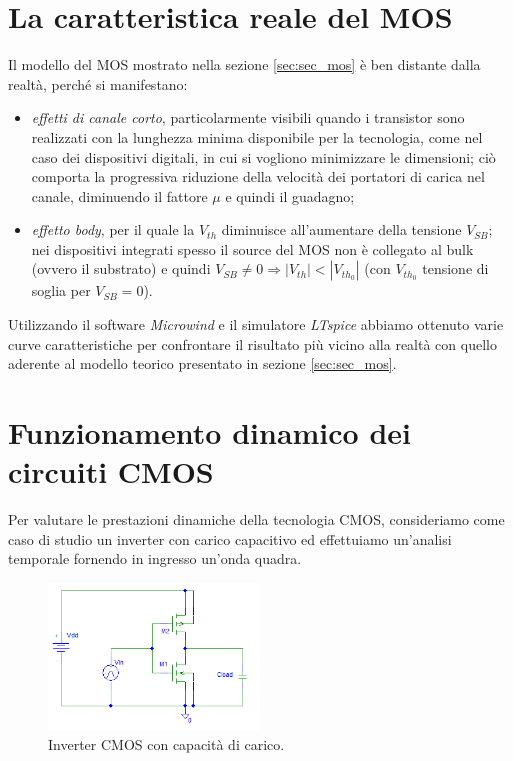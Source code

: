 \section{La caratteristica reale del MOS}
\label{sec:sec_caratteristicaMOS}
Il modello del MOS mostrato nella sezione \ref{sec:sec_mos} è ben distante dalla realtà, perché si manifestano:
\begin{itemize}
	\item \textit{effetti di canale corto}, particolarmente visibili quando i transistor sono realizzati con la lunghezza minima disponibile per la tecnologia, come nel caso dei dispositivi digitali, in cui si vogliono minimizzare le dimensioni; ciò comporta la progressiva riduzione della velocità dei portatori di carica nel canale, diminuendo il fattore $\mu$ e quindi il guadagno;
	\item \textit{effetto body}, per il quale la $V_{th}$ diminuisce all'aumentare della tensione $V_{SB}$; nei dispositivi integrati spesso il source del MOS non è collegato al bulk (ovvero il substrato) e quindi $V_{SB} \neq 0 \Rightarrow \left | V_{th} \right | < \left | V_{th_0} \right | $ (con $V_{th_0}$ tensione di soglia per $V_{SB}=0$).
\end{itemize}

Utilizzando il software \textit{Microwind} e il simulatore \textit{LTspice} abbiamo ottenuto varie curve caratteristiche per confrontare il risultato più vicino alla realtà con quello aderente al modello teorico presentato in sezione \ref{sec:sec_mos}.

\section{Funzionamento dinamico dei circuiti CMOS}

Per valutare le prestazioni dinamiche della tecnologia CMOS, consideriamo come caso di studio un inverter con carico capacitivo ed effettuiamo un'analisi temporale fornendo in ingresso un'onda quadra.

\begin{figure}[hbt!]
	\centering
	\includegraphics[width=0.5\textwidth]{figure/Sch_InverterCMOS.PNG}
	\caption{Inverter CMOS con capacità di carico.}
	\label{fig:fig_sch_inverterCMOS}
\end{figure}

